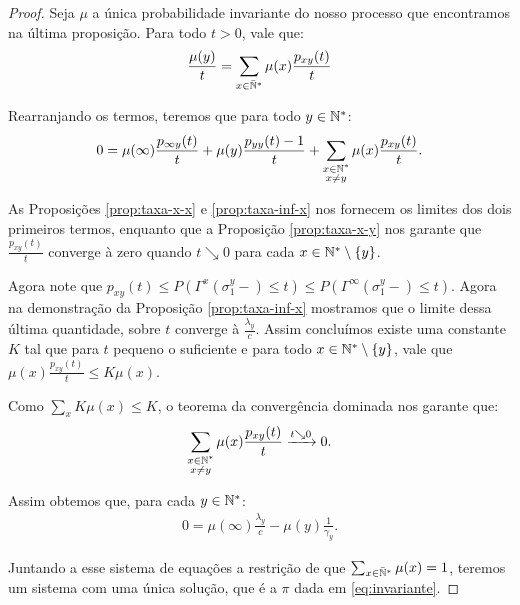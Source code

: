 \begin{proof}
  Seja $\mu$ a única probabilidade invariante do nosso processo que
  encontramos na última proposição. Para todo $t > 0$, vale que:
  \begin{gather*}
    \frac{\mu(y)}{t} = \sum_{x \in {\mathbb{\bar{N}^*}}} \mu(x) \frac{p_{x y}
      (t)}{t}\\
  \end{gather*}

  Rearranjando os termos, teremos que para todo $y \in {\mathbb{N^*}}$:
  \begin{displaymath}
    0 = \mu(\infty) \frac{p_{\infty y}(t)}{t} + 
    \mu(y) \frac{p_{y y}(t) - 1}{t} + 
    \sum_{\substack{x \in {\mathbb{N^*}} \\ x \neq y}} \mu(x) \frac{p_{x
        y}(t)}{t}.
  \end{displaymath}

  As Proposições \ref{prop:taxa-x-x} e \ref{prop:taxa-inf-x} nos
  fornecem os limites dos dois primeiros termos, enquanto que a
  Proposição \ref{prop:taxa-x-y} nos garante que $\frac{p_{x
      y}(t)}{t}$ converge à zero quando $t \searrow 0$ para cada $x
  \in {\mathbb{N^*}} \setminus \{y\}$.

  Agora note que $p_{x y} (t) \leq P(\Gamma^x (\sigma_1^y -) \leq t)
  \leq P(\Gamma^\infty (\sigma_1^y -) \leq t)$. Agora na demonstração
  da Proposição \ref{prop:taxa-inf-x} mostramos que o limite dessa
  última quantidade, sobre $t$ converge à $\frac{\lambda_y}{c}$. Assim
  concluímos existe uma constante $K$ tal que para $t$ pequeno o
  suficiente e para todo $x \in {\mathbb{N^*}}\setminus \{ y\}$, vale que
  $\mu(x)\frac{p_{x y}(t)}{t} \leq K \mu(x)$.

  Como $\sum_{x} K \mu(x) \leq K$, o teorema da convergência dominada
  nos garante que:
  \begin{displaymath}
    \sum_{\substack{x \in {\mathbb{N^*}} \\ x \neq y}} \mu(x)
    \frac{p_{x y}(t)}{t} \xrightarrow{t \searrow 0} 0.
  \end{displaymath}

  Assim obtemos que, para cada $y \in {\mathbb{N^*}}$:
  \begin{gather*}
    0 = \mu(\infty) \frac{\lambda_y}{c} - \mu(y) \frac{1}{\gamma_y}.
  \end{gather*}

  Juntando a esse sistema de equações a restrição de que
  $\sum_{x\in{\mathbb{\bar{N}^*}}}\mu(x) = 1$, teremos um sistema com uma única
  solução, que é a $\pi$ dada em \eqref{eq:invariante}.
\end{proof}

